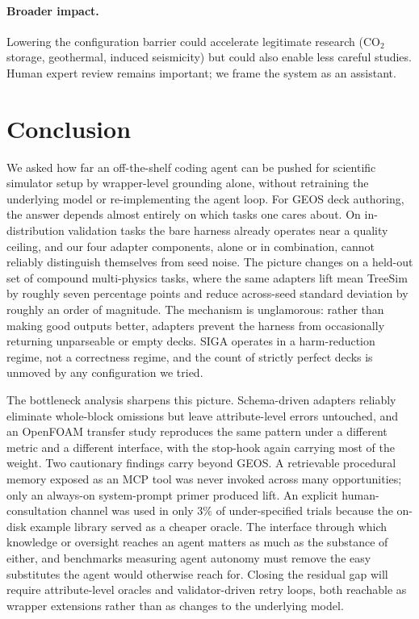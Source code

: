 \documentclass{article}
\begin{document}
\paragraph{Broader impact.} Lowering the configuration barrier could accelerate legitimate research (CO$_2$ storage, geothermal, induced seismicity) but could also enable less careful studies. Human expert review remains important; we frame the system as an assistant.


\section{Conclusion}
\label{sec:conclusion}

We asked how far an off-the-shelf coding agent can be pushed for scientific simulator setup by wrapper-level grounding alone, without retraining the underlying model or re-implementing the agent loop. For GEOS deck authoring, the answer depends almost entirely on which tasks one cares about. On in-distribution validation tasks the bare harness already operates near a quality ceiling, and our four adapter components, alone or in combination, cannot reliably distinguish themselves from seed noise. The picture changes on a held-out set of compound multi-physics tasks, where the same adapters lift mean TreeSim by roughly seven percentage points and reduce across-seed standard deviation by roughly an order of magnitude. The mechanism is unglamorous: rather than making good outputs better, adapters prevent the harness from occasionally returning unparseable or empty decks. SIGA operates in a harm-reduction regime, not a correctness regime, and the count of strictly perfect decks is unmoved by any configuration we tried.

The bottleneck analysis sharpens this picture. Schema-driven adapters reliably eliminate whole-block omissions but leave attribute-level errors untouched, and an OpenFOAM transfer study reproduces the same pattern under a different metric and a different interface, with the stop-hook again carrying most of the weight. Two cautionary findings carry beyond GEOS. A retrievable procedural memory exposed as an MCP tool was never invoked across many opportunities; only an always-on system-prompt primer produced lift. An explicit human-consultation channel was used in only $3\%$ of under-specified trials because the on-disk example library served as a cheaper oracle. The interface through which knowledge or oversight reaches an agent matters as much as the substance of either, and benchmarks measuring agent autonomy must remove the easy substitutes the agent would otherwise reach for. Closing the residual gap will require attribute-level oracles and validator-driven retry loops, both reachable as wrapper extensions rather than as changes to the underlying model.
\end{document}
